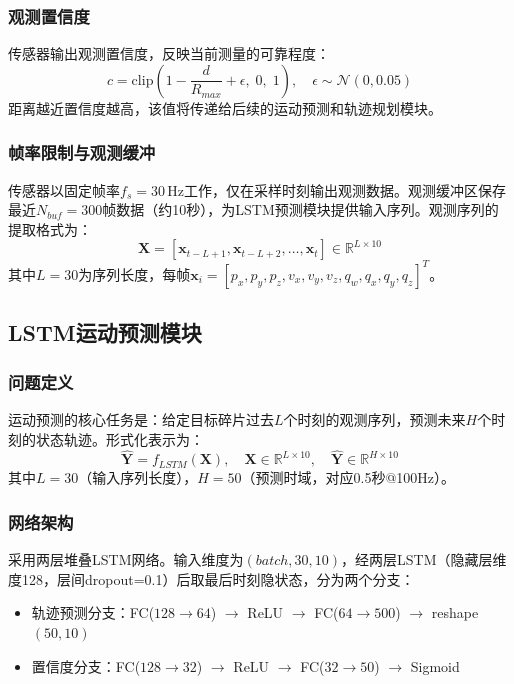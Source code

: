 \documentclass[12pt,a4paper]{ctexart}
\begin{document}
\subsubsection{观测置信度}

传感器输出观测置信度，反映当前测量的可靠程度：
\begin{equation}
  c = \mathrm{clip}\!\left(1 - \frac{d}{R_{max}} + \epsilon,\; 0,\; 1\right), \quad \epsilon \sim \mathcal{N}(0, 0.05)
\end{equation}
距离越近置信度越高，该值将传递给后续的运动预测和轨迹规划模块。

\subsubsection{帧率限制与观测缓冲}

传感器以固定帧率$f_s = 30$\,Hz工作，仅在采样时刻输出观测数据。观测缓冲区保存最近$N_{buf} = 300$帧数据（约10秒），为LSTM预测模块提供输入序列。观测序列的提取格式为：
\begin{equation}
  \mathbf{X} = [\mathbf{x}_{t-L+1}, \mathbf{x}_{t-L+2}, \ldots, \mathbf{x}_t] \in \mathbb{R}^{L \times 10}
\end{equation}
其中$L = 30$为序列长度，每帧$\mathbf{x}_i = [p_x, p_y, p_z, v_x, v_y, v_z, q_w, q_x, q_y, q_z]^T$。


\subsection{LSTM运动预测模块}

\subsubsection{问题定义}

运动预测的核心任务是：给定目标碎片过去$L$个时刻的观测序列，预测未来$H$个时刻的状态轨迹\cite{hochreiter1997}。形式化表示为：
\begin{equation}
  \hat{\mathbf{Y}} = f_{LSTM}(\mathbf{X}), \quad \mathbf{X} \in \mathbb{R}^{L \times 10}, \quad \hat{\mathbf{Y}} \in \mathbb{R}^{H \times 10}
\end{equation}
其中$L = 30$（输入序列长度），$H = 50$（预测时域，对应0.5秒@100Hz）。

\subsubsection{网络架构}

采用两层堆叠LSTM网络。输入维度为$(batch, 30, 10)$，经两层LSTM（隐藏层维度128，层间dropout=0.1）后取最后时刻隐状态，分为两个分支：
\begin{itemize}
  \item 轨迹预测分支：FC($128 \to 64$) $\to$ ReLU $\to$ FC($64 \to 500$) $\to$ reshape$(50, 10)$
  \item 置信度分支：FC($128 \to 32$) $\to$ ReLU $\to$ FC($32 \to 50$) $\to$ Sigmoid
\end{itemize}
\end{document}
